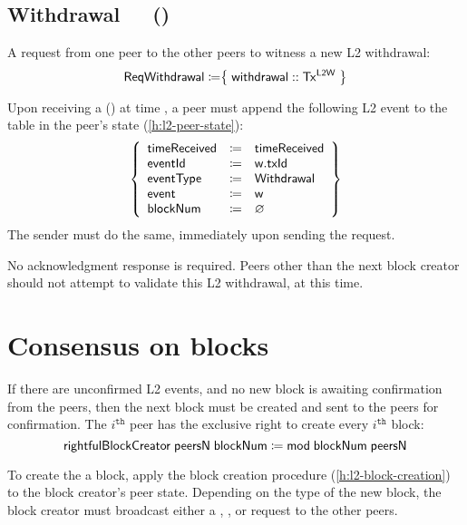 \documentclass[../hydrozoa.tex]{subfiles}
\begin{document}
\subsection{Withdrawal~~~()}%
\label{h:l2-consensus-withdrawal}%

A request from one peer to the other peers to witness a new L2 withdrawal:
\begin{equation*}
  \mathsf{ReqWithdrawal} \coloneq \bigr\{\; \mathsf{withdrawal} :: \mathsf{Tx^{L2W}} \;\bigr\}
\end{equation*}

Upon receiving a () at time , a peer must append the following L2 event to the  table in the peer's state (\cref{h:l2-peer-state}):
\begin{equation*}
  \left\{
  \begin{array}{lll}
    \mathsf{timeReceived} &\coloneq& \mathsf{timeReceived} \\
    \mathsf{eventId} &\coloneq& \mathsf{w.txId} \\
    \mathsf{eventType} &\coloneq& \mathsf{Withdrawal} \\
    \mathsf{event} &\coloneq& \mathsf{w} \\
    \mathsf{blockNum} &\coloneq& \varnothing
  \end{array}\right\}
\end{equation*}
The sender must do the same, immediately upon sending the request.

No acknowledgment response is required.
Peers other than the next block creator should not attempt to validate this L2 withdrawal, at this time.

\section{Consensus on blocks}%
\label{h:l2-consensus-on-blocks}%

If there are unconfirmed L2 events, and no new block is awaiting confirmation from the peers, then the next block must be created and sent to the peers for confirmation.
The $i^\mathtt{th}$ peer has the exclusive right to create every $i^\mathtt{th}$ block: 
\begin{equation*}
  \mathsf{rightfulBlockCreator} \; \mathsf{peersN} \; \mathsf{blockNum} \coloneq
    \mathsf{mod} \; \mathsf{blockNum} \; \mathsf{peersN}
\end{equation*}

To create the a block, apply the block creation procedure (\cref{h:l2-block-creation}) to the block creator's peer state.
Depending on the type of the new block, the block creator must broadcast either a , , or  request to the other peers.
\end{document}
